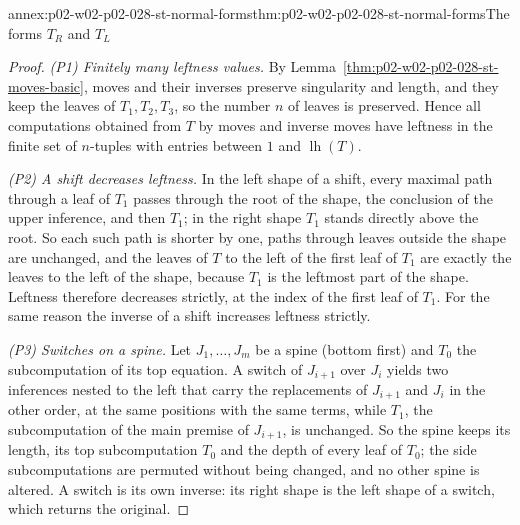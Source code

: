 \begin{annexitem}{annex:p02-w02-p02-028-st-normal-forms}{thm:p02-w02-p02-028-st-normal-forms}{The forms \(T_R\) and \(T_L\)}
\begin{proof}
\emph{(P1) Finitely many leftness values.}  By
Lemma~\ref{thm:p02-w02-p02-028-st-moves-basic}, moves and their inverses
preserve singularity and length, and they keep the leaves of
\(T_1,T_2,T_3\), so the number \(n\) of leaves is preserved.  Hence all
computations obtained from \(T\) by moves and inverse moves have leftness in
the finite set of \(n\)-tuples with entries between \(1\) and
\(\operatorname{lh}(T)\).

\emph{(P2) A shift decreases leftness.}  In the left shape of a shift, every
maximal path through a leaf of \(T_1\) passes through the root of the shape,
the conclusion of the upper inference, and then \(T_1\); in the right shape
\(T_1\) stands directly above the root.  So each such path is shorter by one,
paths through leaves outside the shape are unchanged, and the leaves of
\(T\) to the left of the first leaf of \(T_1\) are exactly the leaves to the
left of the shape, because \(T_1\) is the leftmost part of the shape.  Leftness therefore
decreases strictly, at the index of the first leaf of \(T_1\).  For the same
reason the inverse of a shift increases leftness strictly.

\emph{(P3) Switches on a spine.}  Let \(J_1,\ldots,J_m\) be a spine (bottom
first) and \(T_0\) the subcomputation of its top equation.  A switch of
\(J_{i+1}\) over \(J_i\) yields two inferences nested to the left that carry
the replacements of \(J_{i+1}\) and \(J_i\) in the other order, at the same
positions with the same terms, while \(T_1\), the subcomputation of the main
premise of \(J_{i+1}\), is unchanged.  So the spine keeps its length, its
top subcomputation \(T_0\) and the depth of every leaf of \(T_0\); the side
subcomputations are permuted without being changed, and no other spine is
altered.  A switch is its own inverse: its right shape is the left shape of a
switch, which returns the original.


\end{proof}
\end{annexitem}
